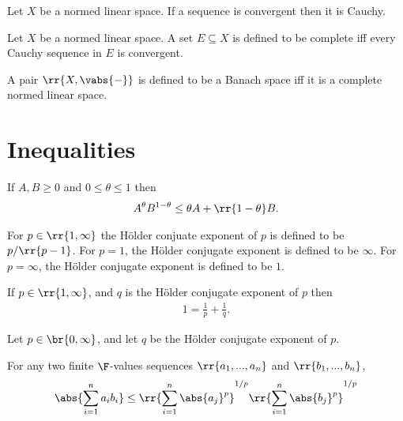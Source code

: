 \documentclass{article}
\begin{document}
\begin{theorem}
  \label{thm:convergent-implies-cauchy}
  Let $X$ be a normed linear space. If a sequence is convergent then it is Cauchy.
\end{theorem}


\begin{definition}
  \label{def:complete}
  Let $X$ be a normed linear space. A set $E\subseteq X$ is defined to be complete iff every Cauchy
  sequence in $E$ is convergent.
\end{definition}


\begin{definition}
  \label{def:banach}
  A pair $ \rr{X, \vabs{-}} $ is defined to be a Banach space iff it is a complete normed linear space.
\end{definition}


\section{Inequalities}
\label{sec:ineqaulities}


\begin{theorem}
  \label{thm:gagm}
  If $A,B\geq 0$ and $0\leq\theta\leq 1$ then
  \begin{align*}
    A^\theta B^{1-\theta} \leq \theta A + \rr{1-\theta}B.
  \end{align*}
\end{theorem}

\begin{definition}
  \label{def:holder-conjugate-exponent}
  For $p\in \rr{1,\infty}$ the H\"older conjuate exponent of $p$ is defined to be $p/ \rr{p-1}$.
  For $p=1$, the H\"older conjugate exponent is defined to be $\infty$. For $p=\infty$, the
  H\"older conjugate exponent is defined to be $1$.
\end{definition}

\begin{theorem}
  \label{thm:hce-equals-one}
  If $p\in \rr{1,\infty}$, and $q$ is the H\"older conjugate exponent of $p$ then
  \begin{align*}
    1 = \frac{1}{p} + \frac{1}{q}.
  \end{align*}
\end{theorem}


\begin{theorem}
  \label{thm:holder-inequality-finite}
  Let $p\in \br{0,\infty}$, and let $q$ be the H\"older conjugate exponent of $p$.

  For any two finite $\F$-values sequences $ \rr{a_1, ..., a_n}$ and $ \rr{b_1, ..., b_n}$,
  \begin{align*}
    \abs{\sum_{i=1}^n a_i b_i}
    \leq \rr{\sum_{i=1}^n \abs{a_j}^p}^{1/p} \rr{\sum_{i=1}^n \abs{b_j}^p}^{1/p}
  \end{align*}
\end{theorem}
\end{document}
